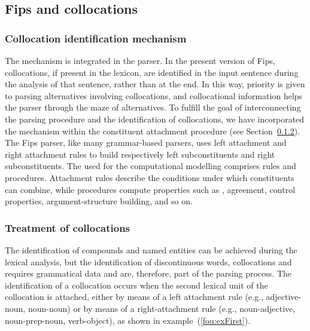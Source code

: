 \documentclass[output=paper]{langsci/langscibook}
\begin{document}
\subsection{Fips and collocations}
\subsubsection{Collocation identification mechanism}
\label{fou:ref:subsubsec:colidme}
The  mechanism is integrated in the parser. In the pre\-sent version of Fips, collocations, if present in the lexicon, are identified in the input sentence during the analysis of that sentence, rather than at the end. In this way, priority is given to parsing alternatives involving collocations, and collocational information helps the parser through the maze of alternatives. 
To fulfill the goal of interconnecting the parsing procedure and the identification of collocations, we have incorporated the  mechanism within the constituent attachment procedure (see Section~\ref{fou:ref:subsubsec:treatcolloc}).
The Fips parser, like many grammar-based parsers, uses left attachment and right attachment rules to build respectively left subconstituents and right subconstituents. The  used for the computational modelling comprises rules and procedures. Attachment rules describe the conditions under which constituents can combine, while procedures compute properties such as , agreement, control properties, argument-structure building, and so on. 

\subsubsection{Treatment of collocations}\label{fou:ref:subsubsec:treatcolloc}

The identification of compounds and named entities can be achieved during the lexical analysis, but the identification of discontinuous words, collocations and  requires grammatical data and are, therefore, part of the parsing process. The identification of a collocation occurs when the second lexical unit of the collocation is attached, either by means of a left attachment rule (e.g., adjective-noun, noun-noun) or by means of a right-attachment rule (e.g., noun-adjective, noun-prep-noun, verb-object), as shown in example~(\ref{fou:exFirst}). %
\end{document}
